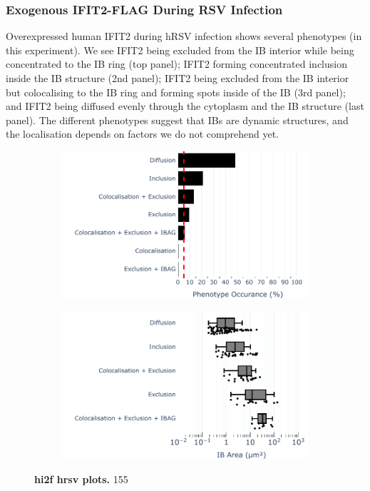 \subsubsection{Exogenous IFIT2-FLAG During RSV Infection} \label{Exogenous IFIT2-FLAG During RSV Infection}
Overexpressed human IFIT2 during hRSV infection shows several phenotypes (in this experiment). We see IFIT2 being excluded from the IB interior while being concentrated to the IB ring (top panel); IFIT2 forming concentrated inclusion inside the IB structure (2nd panel); IFIT2 being excluded from the IB interior but colocalising to the IB ring and forming spots inside of the IB (3rd panel); and IFIT2 being diffused evenly through the cytoplasm and the IB structure (last panel). The different phenotypes suggest that IBs are dynamic structures, and the localisation depends on factors we do not comprehend yet. 

\begin{figure}
    \begin{subfigure}{0.495\textwidth}
        \caption{}
        \includegraphics[width=1\linewidth]{10. Chapter 5/Figs/03. IFIT2-FLAG/03. IFIT2F/02. Infection Transfection/01. bar_hi2f_hrsv.pdf} 
    \end{subfigure}
    \begin{subfigure}{0.495\textwidth}
        \caption{}
        \includegraphics[width=1\linewidth]{10. Chapter 5/Figs/03. IFIT2-FLAG/03. IFIT2F/02. Infection Transfection/02. box_hi2f_hrsv.pdf}
    \end{subfigure}
    \caption[hi2f hrsv plots]{\textbf{hi2f hrsv plots.} 155}
    \label{fig:hi2f hrsv plots}
\end{figure}

